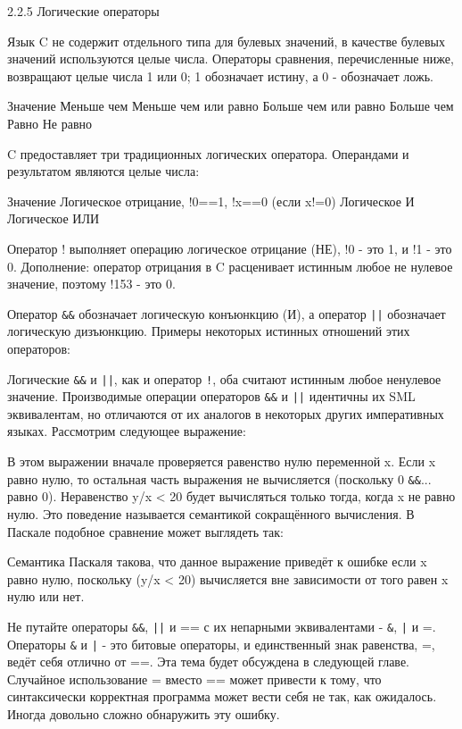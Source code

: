 2.2.5 Логические операторы

Язык C не содержит отдельного типа для булевых значений, в качестве булевых значений используются целые числа. Операторы сравнения, перечисленные ниже, возвращают целые числа 1 или 0; 1 обозначает истину, а 0 - обозначает ложь.

Значение
Меньше чем
Меньше чем или равно
Больше чем или равно
Больше чем
Равно
Не равно

C предоставляет три традиционных логических оператора. Операндами и результатом являются целые числа:

Значение
Логическое отрицание, !0==1, !x==0 (если x!=0)
Логическое И
Логическое ИЛИ

Оператор ! выполняет операцию логическое отрицание (НЕ), !0 - это 1, и !1 - это 0. Дополнение: оператор отрицания в C расценивает истинным любое не нулевое значение, поэтому !153 - это 0.

Оператор \lstinline|&&| обозначает логическую конъюнкцию (И), а оператор \lstinline!||! обозначает логическую дизъюнкцию. Примеры некоторых истинных отношений этих операторов:

Логические \lstinline|&&| и \lstinline!||!, как и оператор \lstinline|!|, оба считают истинным любое ненулевое значение. Производимые операции операторов \lstinline|&&| и \lstinline!||! идентичны их SML эквивалентам, но отличаются от их аналогов в некоторых других императивных языках. Рассмотрим следующее выражение:

В этом выражении вначале проверяется равенство нулю переменной x. Если x равно нулю, то остальная часть выражения не вычисляется (поскольку 0 \lstinline|&&|... равно 0). Неравенство y/x < 20 будет вычисляться только тогда, когда x не равно нулю. Это поведение называется семантикой сокращённого вычисления. В Паскале подобное сравнение может выглядеть так:

Семантика Паскаля такова, что данное выражение приведёт к ошибке если x равно нулю, поскольку (y/x < 20) вычисляется вне зависимости от того равен x нулю или нет.

Не путайте операторы \lstinline|&&|, \lstinline!||! и == с их непарными эквивалентами - \lstinline!&!, \lstinline!|! и =. Операторы \lstinline!&! и \lstinline!|! - это битовые операторы, и единственный знак равенства, =, ведёт себя отлично от ==. Эта тема будет обсуждена в следующей главе. Случайное использование = вместо == может привести к тому, что синтаксически корректная программа может вести себя не так, как ожидалось. Иногда довольно сложно обнаружить эту ошибку.

